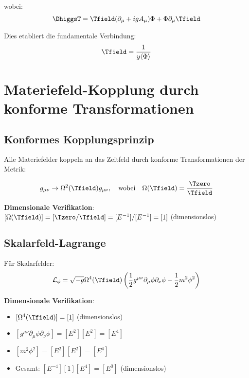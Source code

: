 	wobei:
	\begin{equation}
		\DhiggsT = \Tfield (\partial_\mu + ig A_\mu) \Phi + \Phi \partial_\mu \Tfield
		\label{eq:higgs_verbindung}
	\end{equation}
	
	Dies etabliert die fundamentale Verbindung:
	\begin{equation}
		\Tfield = \frac{1}{y\langle\Phi\rangle}
		\label{eq:zeit_higgs_relation}
	\end{equation}
	
	\section{Materiefeld-Kopplung durch konforme Transformationen}
	\label{sec:materie_kopplung}
	
	\subsection{Konformes Kopplungsprinzip}
	\label{subsec:konformes_kopplungsprinzip}
	
	Alle Materiefelder koppeln an das Zeitfeld durch konforme Transformationen der Metrik:
	
	\begin{equation}
		g_{\mu\nu} \to \Omega^2(\Tfield) g_{\mu\nu}, \quad \text{wobei} \quad \Omega(\Tfield) = \frac{\Tzero}{\Tfield}
		\label{eq:konforme_transformation}
	\end{equation}
	
	\textbf{Dimensionale Verifikation}: $[\Omega(\Tfield)] = [\Tzero/\Tfield] = [E^{-1}]/[E^{-1}] = [1]$ (dimensionslos) \checkmark
	
	\subsection{Skalarfeld-Lagrange}
	\label{subsec:skalarfeld_lagrange}
	
	Für Skalarfelder:
	\begin{equation}
		\mathcal{L}_\phi = \sqrt{-g} \Omega^4(\Tfield) \left(\frac{1}{2} g^{\mu\nu} \partial_\mu \phi \partial_\nu \phi - \frac{1}{2} m^2 \phi^2\right)
		\label{eq:skalar_lagrange}
	\end{equation}
	
	\textbf{Dimensionale Verifikation}:
	\begin{itemize}
		\item $[\Omega^4(\Tfield)] = [1]$ (dimensionslos)
		\item $[g^{\mu\nu} \partial_\mu \phi \partial_\nu \phi] = [E^2][E^2] = [E^4]$
		\item $[m^2 \phi^2] = [E^2][E^2] = [E^4]$
		\item Gesamt: $[E^{-4}][1][E^4] = [E^0]$ (dimensionslos) \checkmark
	\end{itemize}
	
